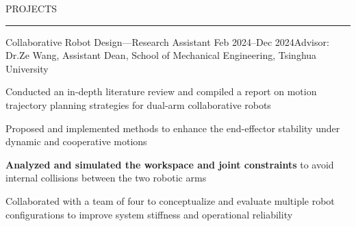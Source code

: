 \documentclass{resume} %
\renewenvironment{rSection}[1]{
\sectionskip
\textcolor{TsinghuaPurple}{\MakeUppercase{#1}}
\sectionlineskip
\hrule
\begin{list}{}{
\setlength{\leftmargin}{0em}
}
\item[]
}{
\end{list}
}
\begin{document}
\begin{rSection}{PROJECTS}
    \newpage
    
    \begin{rSubsection}{Collaborative Robot Design---Research Assistant} {Feb 2024--Dec 2024}{Advisor: Dr.Ze Wang, Assistant Dean, School of Mechanical Engineering, Tsinghua University}{}
        \item Conducted an in-depth literature review and compiled a report on motion trajectory planning strategies for dual-arm collaborative robots
        \item Proposed and implemented methods to enhance the end-effector stability under dynamic and cooperative motions
        \item \textbf{Analyzed and simulated the workspace and joint constraints} to avoid internal collisions between the two robotic arms
        \item Collaborated with a team of four to conceptualize and evaluate multiple robot configurations to improve system stiffness and operational reliability
    \end{rSubsection} 
    
    \end{rSection}
    
\end{document}
